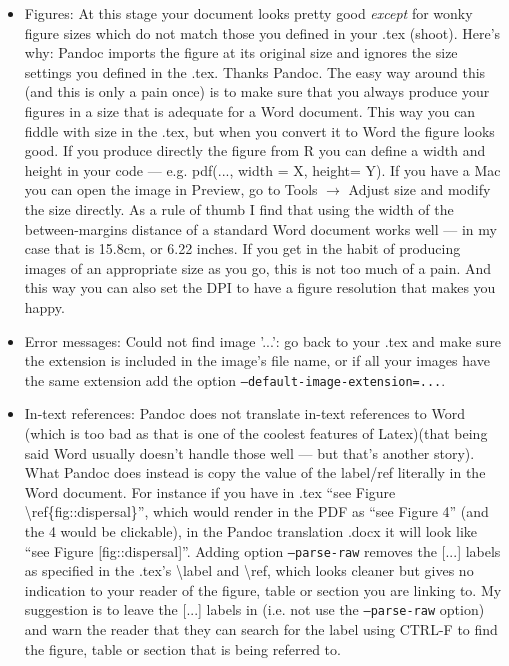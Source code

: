 \documentclass{article}
\begin{document}
\begin{enumerate}
\begin{itemize}
\item Figures: At this stage your document looks pretty good \emph{except} for wonky
  figure sizes which do not match those you defined in your .tex
  (shoot). Here's why: Pandoc imports the figure at its
  original size and ignores the size settings you defined in the
  .tex. Thanks Pandoc. The easy way around this (and this is only a
  pain once) is to make sure that you always produce your figures in a
  size that is adequate for a Word document. This way you can fiddle
  with size in the .tex, but when you convert it to Word the figure
  looks good. If you produce directly the figure from R you can define
  a width and height in your code --- e.g. pdf(..., width = X, height=
  Y). If you have a Mac you can open the image in Preview, go to Tools
  $\rightarrow$ Adjust size and modify the size directly. As a rule of
  thumb I find that using the width of the between-margins distance of
  a standard Word document works well --- in my case that is 15.8cm,
  or 6.22 inches. If you get in the habit of producing images of an
  appropriate size as you go, this is not too much of a pain. And this
  way you can also set the DPI to have a figure resolution that makes
  you happy.

\item Error messages: Could not find image '...': go back to your .tex
  and make sure the extension is included in the image's file name, or
  if all your images have the same extension add the option
  \texttt{{--}default-image-extension=...}.

\item In-text references: Pandoc does not translate in-text references to Word (which is
  too bad as that is one of the coolest features of Latex)(that being
  said Word usually doesn't handle those well --- but that's another
  story). What Pandoc does instead is copy the value of the label/ref
  literally in the Word document. For instance if you have in .tex
  ``see Figure {\textbackslash ref\{fig::dispersal\}}'', which would render in the PDF
  as ``see Figure 4'' (and the 4 would be clickable), in the Pandoc translation .docx it will look
  like ``see Figure [fig::dispersal]''. Adding option \texttt{{--}parse-raw} removes
  the [...] labels as specified in the .tex's \textbackslash label and
  \textbackslash ref, which looks cleaner but gives no indication to
  your reader of the figure, table or section you are linking to. My
  suggestion is to leave the [...] labels in (i.e. not use the
  \texttt{{--}parse-raw} option) and warn the reader that they can search for
  the label using CTRL-F to find the figure, table or section that is
  being referred to.

\end{itemize}

\end{enumerate}
\end{document}
